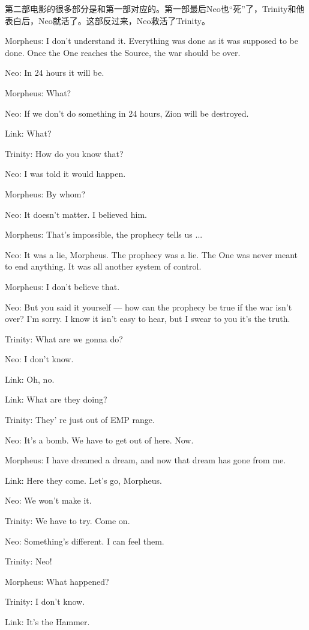 \documentclass[UTF8]{ctexart}
\newenvironment{myquote}{\color{green} \setlength{\leftskip}{6em} \setlength{\rightskip}{4em} \setlength{\parindent}{-2em}}{\par}
\begin{document}
第二部电影的很多部分是和第一部对应的。第一部最后Neo也“死”了，Trinity和他表白后，Neo就活了。这部反过来，Neo救活了Trinity。

\begin{myquote}
Morpheus: I don't understand it. Everything was done as it was supposed to be done. Once the One reaches the Source, the war should be over.

Neo: In 24 hours it will be.

Morpheus: What?

Neo: If we don't do something in 24 hours, Zion will be destroyed.

Link: What?

Trinity: How do you know that?

Neo: I was told it would happen.

Morpheus: By whom?

Neo: It doesn't matter. I believed him.

Morpheus: That's impossible, the prophecy tells us ...

Neo: It was a lie, Morpheus. The prophecy was a lie. The One was never meant to end anything. It was all another system of control.

Morpheus: I don't believe that.

Neo: But you said it yourself --- how can the prophecy be true if the war isn't over? I'm sorry. I know it isn't easy to hear, but I swear to you it's the truth.

Trinity: What are we gonna do?

Neo: I don't know.

Link: Oh, no.

Link: What are they doing?

Trinity: They' re just out of EMP range.

Neo: It's a bomb. We have to get out of here. Now.

Morpheus: I have dreamed a dream, and now that dream has gone from me.

Link: Here they come. Let's go, Morpheus.

Neo: We won't make it.

Trinity: We have to try. Come on.

Neo: Something's different. I can feel them.

Trinity: Neo!

Morpheus: What happened?

Trinity: I don't know.

Link: It's the Hammer.


\end{myquote}
\end{document}
